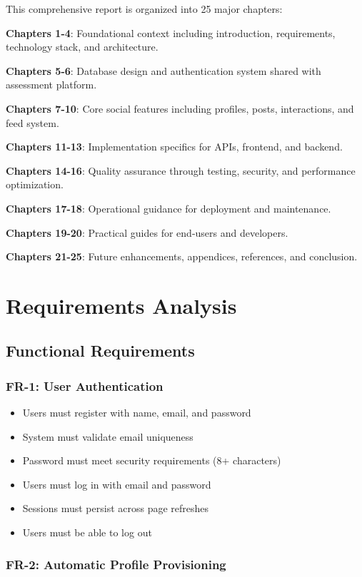 \documentclass[12pt,a4paper]{report}
\begin{document}
This comprehensive report is organized into 25 major chapters:

\textbf{Chapters 1-4}: Foundational context including introduction, requirements, technology stack, and architecture.

\textbf{Chapters 5-6}: Database design and authentication system shared with assessment platform.

\textbf{Chapters 7-10}: Core social features including profiles, posts, interactions, and feed system.

\textbf{Chapters 11-13}: Implementation specifics for APIs, frontend, and backend.

\textbf{Chapters 14-16}: Quality assurance through testing, security, and performance optimization.

\textbf{Chapters 17-18}: Operational guidance for deployment and maintenance.

\textbf{Chapters 19-20}: Practical guides for end-users and developers.

\textbf{Chapters 21-25}: Future enhancements, appendices, references, and conclusion.

\chapter{Requirements Analysis}

\section{Functional Requirements}

\subsection{FR-1: User Authentication}

\begin{itemize}
    \item Users must register with name, email, and password
    \item System must validate email uniqueness
    \item Password must meet security requirements (8+ characters)
    \item Users must log in with email and password
    \item Sessions must persist across page refreshes
    \item Users must be able to log out
\end{itemize}

\subsection{FR-2: Automatic Profile Provisioning}
\end{document}
